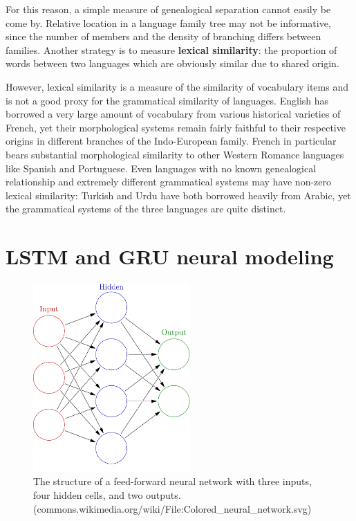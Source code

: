For this reason, a simple measure of genealogical separation cannot easily be come by. Relative location in a language family tree may not be informative, since the number of members and the density of branching differs between families. Another strategy is to measure \textbf{lexical similarity}: the proportion of words between two languages which are obviously similar due to shared origin.

However, lexical similarity is a measure of the similarity of vocabulary items and is not a good proxy for the grammatical similarity of languages. English has borrowed a very large amount of vocabulary from various historical varieties of French, yet their morphological systems remain fairly faithful to their respective origins in different branches of the Indo-European family. French in particular bears substantial morphological similarity to other Western Romance languages like Spanish and Portuguese. Even languages with no known genealogical relationship and extremely different grammatical systems may have non-zero lexical similarity: Turkish and Urdu have both borrowed heavily from Arabic, yet the grammatical systems of the three languages are quite distinct.

\section{LSTM and GRU neural modeling}

\begin{figure}[p]
\includegraphics[width=6cm]{images/1000px-Colored_neural_network.png}
\centering
\caption{The structure of a feed-forward neural network with three inputs, four hidden cells, and two outputs. \\ (commons.wikimedia.org/wiki/File:Colored\_neural\_network.svg)}
\end{figure}


